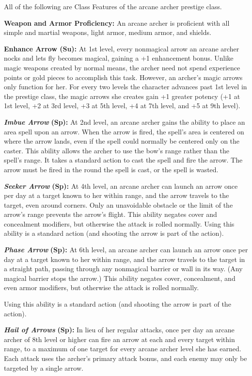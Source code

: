 \documentclass{article}
\begin{document}
All of the following are Class Features of the arcane archer prestige class.

\textbf{Weapon and Armor Proficiency:} An arcane archer is proficient with all 
simple and martial weapons, light armor, medium armor, and shields.

\textbf{Enhance Arrow (Su):} At 1st level, every nonmagical arrow an arcane archer 
nocks and lets fly becomes magical, gaining a +1 enhancement bonus. Unlike magic 
weapons created by normal means, the archer need not spend experience points or 
gold pieces to accomplish this task. However, an archer's magic arrows only function 
for her. For every two levels the character advances past 1st level in the prestige 
class, the magic arrows she creates gain +1 greater potency (+1 at 1st level, +2 
at 3rd level, +3 at 5th level, +4 at 7th level, and +5 at 9th level).

\textit{\textbf{Imbue Arrow }}\textbf{(Sp): }At 2nd level, an arcane archer gains 
the ability to place an area spell upon an arrow. When the arrow is fired, the 
spell's area is centered on where the arrow lands, even if the spell could normally 
be centered only on the caster. This ability allows the archer to use the bow's 
range rather than the spell's range. It takes a standard action to cast the spell 
and fire the arrow. The arrow must be fired in the round the spell is cast, or 
the spell is wasted.

\textit{\textbf{Seeker Arrow }}\textbf{(Sp):} At 4th level, an arcane archer can 
launch an arrow once per day at a target known to her within range, and the arrow 
travels to the target, even around corners. Only an unavoidable obstacle or the 
limit of the arrow's range prevents the arrow's flight. This ability negates cover 
and concealment modifiers, but otherwise the attack is rolled normally. Using this 
ability is a standard action (and shooting the arrow is part of the action).

\textit{\textbf{Phase Arrow }}\textbf{(Sp):} At 6th level, an arcane archer can 
launch an arrow once per day at a target known to her within range, and the arrow 
travels to the target in a straight path, passing through any nonmagical barrier 
or wall in its way. (Any magical barrier stops the arrow.) This ability negates 
cover, concealment, and even armor modifiers, but otherwise the attack is rolled 
normally.

Using this ability is a standard action (and shooting the arrow is part of the 
action).

\textit{\textbf{Hail of Arrows }}\textbf{(Sp):} In lieu of her regular attacks, 
once per day an arcane archer of 8th level or higher can fire an arrow at each 
and every target within range, to a maximum of one target for every arcane archer 
level she has earned. Each attack uses the archer's primary attack bonus, and each 
enemy may only be targeted by a single arrow.
\end{document}
